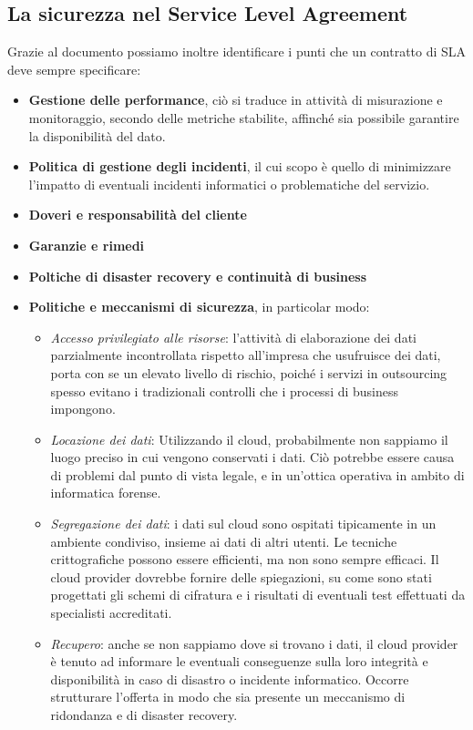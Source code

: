 \subsection {La sicurezza nel Service Level Agreement}
Grazie al documento \cite{CloudSecurityIssues} possiamo inoltre identificare i punti che un contratto di SLA deve sempre specificare:
\begin{itemize}
\item \textbf{Gestione delle performance}, ciò si traduce in attività di misurazione e monitoraggio, secondo delle metriche stabilite, affinché sia possibile garantire la disponibilità del dato.
\item \textbf{Politica di gestione degli incidenti}, il cui scopo è quello di minimizzare l'impatto di eventuali incidenti informatici o problematiche del servizio.
\item \textbf{Doveri e responsabilità del cliente}
\item \textbf{Garanzie e rimedi}
\item \textbf{Poltiche di disaster recovery e continuità di business}
\item \textbf{Politiche e meccanismi di sicurezza}, in particolar modo:
\begin{itemize}
\item \textit{Accesso privilegiato alle risorse}: l'attività di elaborazione dei dati parzialmente incontrollata rispetto all'impresa che usufruisce dei dati, porta con se un elevato livello di rischio, poiché i servizi in outsourcing spesso evitano i tradizionali controlli che i processi di business impongono.
\item \textit{Locazione dei dati}: Utilizzando il cloud, probabilmente non sappiamo il luogo preciso in cui vengono conservati i dati. Ciò potrebbe essere causa di problemi dal punto di vista legale, e in un'ottica operativa in ambito di informatica forense.
\item \textit{Segregazione dei dati}: i dati sul cloud sono ospitati tipicamente in un ambiente condiviso, insieme ai dati di altri utenti. Le tecniche crittografiche possono essere efficienti, ma non sono sempre efficaci. Il cloud provider dovrebbe fornire delle spiegazioni, su come sono stati progettati gli schemi di cifratura e i risultati di eventuali test effettuati da specialisti accreditati.
\item \textit{Recupero}: anche se non sappiamo dove si trovano i dati, il cloud provider è tenuto ad informare le eventuali conseguenze sulla loro integrità e disponibilità in caso di disastro o incidente informatico. Occorre strutturare l'offerta in modo che sia presente un meccanismo di ridondanza e di disaster recovery.

\end{itemize}
\end{itemize}
